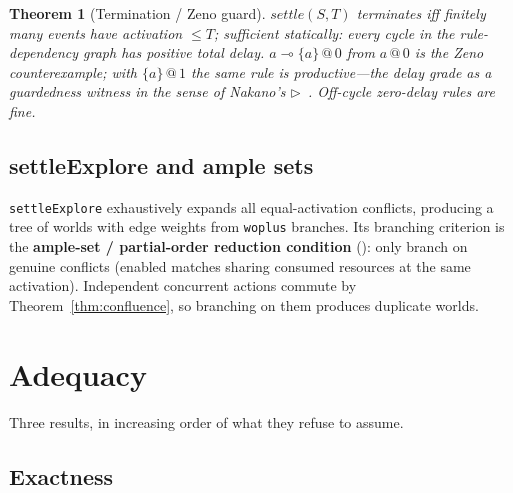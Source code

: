 \documentclass[11pt]{article}
\makeatletter
\newcommand{\lax}[2]{\{#1\}\mathbin{@}#2}       %
\newcommand{\loli}{\multimap}                    %
\newcommand{\stmp}[2]{#1\mathbin{@}#2}           %
\newcommand{\settle}{\mathit{settle}}
\newtheorem{theorem}{Theorem}[section]
\theoremstyle{definition}
\theoremstyle{remark}
\makeatother
\begin{document}
\begin{theorem}[Termination / Zeno guard]
\label{thm:termination}
$\settle(S,T)$ terminates iff finitely many events have activation $\leq T$;
sufficient statically: every cycle in the rule-dependency graph has positive total
delay.  $a \loli \lax{a}{0}$ from $\stmp{a}{0}$ is the Zeno counterexample; with
$\lax{a}{1}$ the same rule is productive---the delay grade as a guardedness
witness in the sense of Nakano's $\triangleright$~\cite{Nakano2000}.  Off-cycle
zero-delay rules are fine.
\end{theorem}

\subsection{settleExplore and ample sets}

\texttt{settleExplore} exhaustively expands all equal-activation conflicts,
producing a tree of worlds with edge weights from \texttt{woplus} branches.  Its
branching criterion is the \textbf{ample-set / partial-order reduction condition}
(\cite{Peled1993}): only branch on genuine conflicts (enabled matches sharing
consumed resources at the same activation).  Independent concurrent actions commute
by Theorem~\ref{thm:confluence}, so branching on them produces duplicate worlds.

\section{Adequacy}
\label{sec:adequacy}

Three results, in increasing order of what they refuse to assume.

\subsection{Exactness}
\label{subsec:exact}
\end{document}
